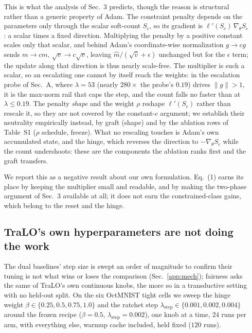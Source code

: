 \documentclass[letterpaper]{article}
\begin{document}
This is what the analysis of Sec.~3 predicts, though the reason is structural rather than
a generic property of Adam. The constraint penalty depends on the parameters only through
the scalar soft-count $S_c$, so its gradient is $\ell'(S_c)\,\nabla_\theta S_c$: a scalar
times a fixed direction. Multiplying the penalty by a positive constant scales only that
scalar, and behind Adam's coordinate-wise normalization $g\!\to\!cg$ sends $m\!\to\!cm$,
$\sqrt{v}\!\to\!c\sqrt{v}$, leaving $\hat m/(\sqrt{\hat v}+\epsilon)$ unchanged but for the
$\epsilon$ term; the update along that direction is thus nearly scale-free. The multiplier
is such a scalar, so an escalating one cannot by itself reach the weights: in the
escalation probe of Sec.~A, where $\lambda{=}53$ (nearly $280\times$ the probe's $0.19$)
drives $\|g\|{>}1$, it is the max-norm rail that caps the step, and the count falls no
faster than at $\lambda\!\le\!0.19$. The penalty \emph{shape} and the weight $\rho$ reshape
$\ell'(S_c)$ rather than rescale it, so they are not covered by the constant-$c$ argument;
we establish their neutrality empirically instead, by graft (shape) and by the ablation
rows of Table~S1 ($\rho$ schedule, freeze). What no rescaling touches is Adam's own
accumulated state, and the hinge, which reverses the direction to $-\nabla_\theta S_c$
while the count undershoots: these are the components the ablation ranks first and the
graft transfers.

We report this as a negative result about our own formulation. Eq.~(1) earns its place by
keeping the multiplier small and readable, and by making the two-phase argument of
Sec.~3 available at all; it does not earn the constrained-class gains, which belong to
the reset and the hinge.

\subsection{TraLO's own hyperparameters are not doing the work}
\label{app:tralo-sweep}

The dual baselines' step size is swept an order of magnitude to confirm their tuning is not
what wins or loses the comparison (Sec.~\ref{app:mech}); fairness asks the same of TraLO's
own continuous knobs, the more so in a transductive setting with no held-out split. On the
six OctMNIST tight cells we sweep the hinge weight $\beta\in\{0.25,0.5,0.75,1.0\}$ and the
ratchet step $\lambda_{\text{step}}\in\{0.001,0.002,0.004\}$ around the frozen recipe
($\beta{=}0.5$, $\lambda_{\text{step}}{=}0.002$), one knob at a time, $24$ runs per arm,
with everything else, warmup cache included, held fixed ($120$ runs).
\end{document}
